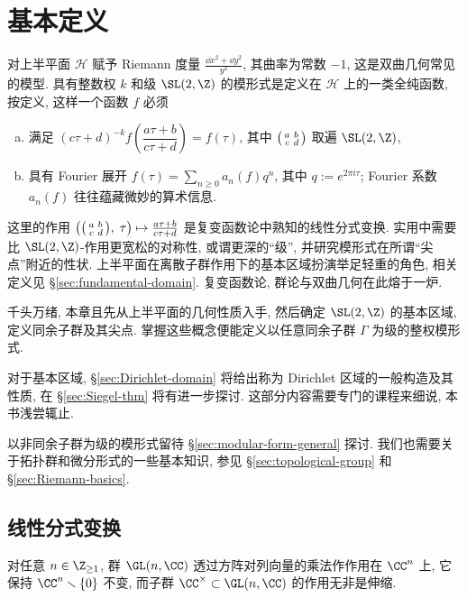 
\chapter{基本定义}
对上半平面 $\mathcal{H}$ 赋予 Riemann 度量 $\frac{\dd x^2 + \dd y^2}{y^2}$, 其曲率为常数 $-1$, 这是双曲几何常见的模型. 具有整数权 $k$ 和级 $\SL(2,\Z)$ 的模形式是定义在 $\mathcal{H}$ 上的一类全纯函数, 按定义, 这样一个函数 $f$ 必须
\begin{enumerate}[(a)]
	\item 满足 $(c\tau + d)^{-k} f\left( \dfrac{a\tau+b}{c\tau+d} \right) = f(\tau)$, 其中 $\bigl(\begin{smallmatrix} a & b \\ c & d \end{smallmatrix}\bigr)$ 取遍 $\SL(2,\Z)$, 
	\item 具有 Fourier 展开 $f(\tau) = \sum_{n \geq 0} a_n(f) q^n$, 其中 $q := e^{2\pi i\tau}$; Fourier 系数 $a_n(f)$ 往往蕴藏微妙的算术信息.
\end{enumerate}
这里的作用 $\left( \bigl(\begin{smallmatrix} a & b \\ c & d \end{smallmatrix}\bigr), \; \tau \right) \mapsto \frac{a\tau+b}{c\tau+d}$ 是复变函数论中熟知的线性分式变换. 实用中需要比 $\SL(2,\Z)$-作用更宽松的对称性, 或谓更深的``级'', 并研究模形式在所谓``尖点''附近的性状. 上半平面在离散子群作用下的基本区域扮演举足轻重的角色, 相关定义见 \S\ref{sec:fundamental-domain}. 复变函数论, 群论与双曲几何在此熔于一炉.

千头万绪, 本章且先从上半平面的几何性质入手, 然后确定 $\SL(2,\Z)$ 的基本区域, 定义同余子群及其尖点. 掌握这些概念便能定义以任意同余子群 $\Gamma$ 为级的整权模形式.

对于基本区域, \S\ref{sec:Dirichlet-domain} 将给出称为 Dirichlet 区域的一般构造及其性质, 在 \S\ref{sec:Siegel-thm} 将有进一步探讨. 这部分内容需要专门的课程来细说, 本书浅尝辄止.

以非同余子群为级的模形式留待 \S\ref{sec:modular-form-general} 探讨. 我们也需要关于拓扑群和微分形式的一些基本知识, 参见 \S\ref{sec:topological-group} 和 \S\ref{sec:Riemann-basics}.

\section{线性分式变换}\label{sec:linear-fractional-transform}
对任意 $n \in \Z_{\geq 1}$, 群 $\GL(n,\CC)$ 透过方阵对列向量的乘法作作用在 $\CC^n$ 上, 它保持 $\CC^n \smallsetminus \{0\}$ 不变, 而子群 $\CC^\times \subset \GL(n,\CC)$ 的作用无非是伸缩.

